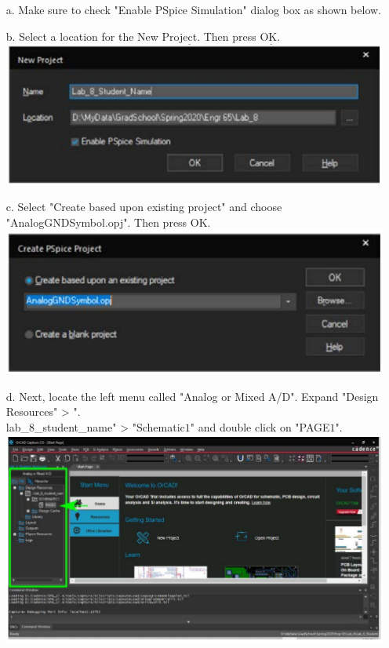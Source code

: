 \documentclass[a4paper]{article}
\begin{document}
\begin{itemize}
\begin{itemize}
    \item[a.] Make sure to check "Enable PSpice Simulation" dialog box as shown below.
    \item[b.] Select a location for the New Project. Then press OK. \\
    \includegraphics[scale=0.5]{2.png} \\ 
    \item[c.] Select "Create based upon existing project" and choose "AnalogGNDSymbol.opj". Then press OK. \\
    \includegraphics[scale=0.5]{3.png} \\ 
    \item[d.] Next, locate the left menu called "Analog or Mixed A/D". Expand "Design Resources" > ".\\lab\_$8$\_student\_name" > "Schematic$1$" and double click on "PAGE$1$". \\
    \includegraphics[scale=0.5]{4.png} \\ 

\end{itemize}
\end{itemize}
\end{document}
